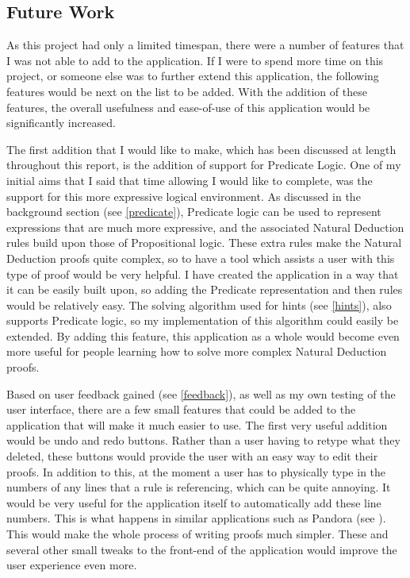 \subsection{Future Work}

As this project had only a limited timespan, there were a number of features that I was not able to add to the application. If I were to spend more time on this project, or someone else was to further extend this application, the following features would be next on the list to be added. With the addition of these features, the overall usefulness and ease-of-use of this application would be significantly increased. 

The first addition that I would like to make, which has been discussed at length throughout this report, is the addition of support for Predicate Logic. One of my initial aims that I said that time allowing I would like to complete, was the support for this more expressive logical environment. As discussed in the background section (see \ref{predicate}), Predicate logic can be used to represent expressions that are much more expressive, and the associated Natural Deduction rules build upon those of Propositional logic. These extra rules make the Natural Deduction proofs quite complex, so to have a tool which assists a user with this type of proof would be very helpful. I have created the application in a way that it can be easily built upon, so adding the Predicate representation and then rules would be relatively easy. The solving algorithm used for hints (see \ref{hints}), also supports Predicate logic, so my implementation of this algorithm could easily be extended. By adding this feature, this application as a whole would become even more useful for people learning how to solve more complex Natural Deduction proofs.

Based on user feedback gained (see \ref{feedback}), as well as my own testing of the user interface, there are a few small features that could be added to the application that will make it much easier to use. The first very useful addition would be undo and redo buttons. Rather than a user having to retype what they deleted, these buttons would provide the user with an easy way to edit their proofs. In addition to this, at the moment a user has to physically type in the numbers of any lines that a rule is referencing, which can be quite annoying. It would be very useful for the application itself to automatically add these line numbers. This is what happens in similar applications such as Pandora (see \cite{pandora}). This would make the whole process of writing proofs much simpler. These and several other small tweaks to the front-end of the application would improve the user experience even more.

